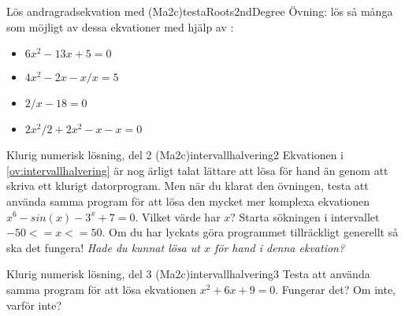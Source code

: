\begin{matteovning}{Lös andragradsekvation med  (Ma2c)}{testaRoots2ndDegree}
Övning: lös så många som möjligt av dessa ekvationer med hjälp av :
\begin{itemize}
\item $6x^2 - 13x + 5 = 0$ %
\item $4x^2 - 2x - x/x = 5$ %
\item $2/x - 18 = 0$ %
\item $2x^2 / 2 + 2x^2 - x - x = 0$ %
\end{itemize}
\end{matteovning}

\begin{matteovnings}{Klurig numerisk lösning, del 2 (Ma2c)}{intervallhalvering2}
Ekvationen i \autoref{ov:intervallhalvering} är nog ärligt talat lättare att lösa för hand än genom att skriva ett klurigt datorprogram. Men när du klarat den övningen, testa att använda samma program för att lösa den mycket mer komplexa ekvationen $x^6 - sin(x) - 3^x + 7 = 0$.
\newline
\newline
Vilket värde har $x$? Starta sökningen i intervallet $-50 <= x <= 50$. Om du har lyckats göra programmet tillräckligt generellt så ska det fungera!
\newline
\newline
\emph{Hade du kunnat lösa ut $x$ för hand i denna ekvation?}
\end{matteovnings}

\begin{matteovnings}{Klurig numerisk lösning, del 3 (Ma2c)}{intervallhalvering3}
Testa att använda samma program för att lösa ekvationen $x^2 + 6x + 9 = 0$. Fungerar det? Om inte, varför inte?
\end{matteovnings}

